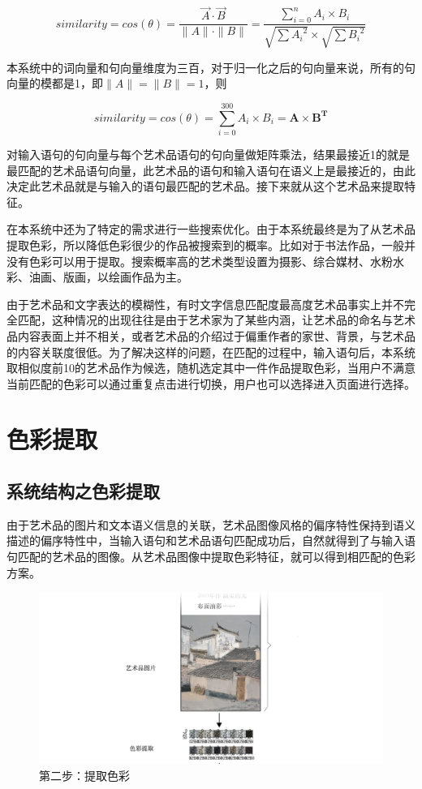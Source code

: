 $$ similarity = cos(\theta)= \frac{\vec{A}\cdot\vec{B}}{\|A\| \cdot \|B\|} = \frac{\sum_{i=0}^{n}{A_i \times B_i}}{\sqrt{\sum{{A_i}^2}} \times \sqrt{\sum{{B_i}^2}}}$$

本系统中的词向量和句向量维度为三百，对于归一化之后的句向量来说，所有的句向量的模都是1，即$\|A\| = \|B\|=1$，则

$$ similarity = cos(\theta)=  \sum_{i=0}^{300}{A_i \times B_i} = \mathbf{A} \times \mathbf{B^T}$$

对输入语句的句向量与每个艺术品语句的句向量做矩阵乘法，结果最接近1的就是最匹配的艺术品语句向量，此艺术品的语句和输入语句在语义上是最接近的，由此决定此艺术品就是与输入的语句最匹配的艺术品。\cite{ravichandran2005randomized}接下来就从这个艺术品来提取特征。

在本系统中还为了特定的需求进行一些搜索优化。由于本系统最终是为了从艺术品提取色彩，所以降低色彩很少的作品被搜索到的概率。比如对于书法作品，一般并没有色彩可以用于提取。搜索概率高的艺术类型设置为摄影、综合媒材、水粉水彩、油画、版画，以绘画作品为主。

由于艺术品和文字表达的模糊性，有时文字信息匹配度最高度艺术品事实上并不完全匹配，这种情况的出现往往是由于艺术家为了某些内涵，让艺术品的命名与艺术品内容表面上并不相关，或者艺术品的介绍过于偏重作者的家世、背景，与艺术品的内容关联度很低。为了解决这样的问题，在匹配的过程中，输入语句后，本系统取相似度前10的艺术品作为候选，随机选定其中一件作品提取色彩，当用户不满意当前匹配的色彩可以通过重复点击进行切换，用户也可以选择进入页面进行选择。

\section{色彩提取}

\subsection{系统结构之色彩提取}

由于艺术品的图片和文本语义信息的关联，艺术品图像风格的偏序特性保持到语义描述的偏序特性中，当输入语句和艺术品语句匹配成功后，自然就得到了与输入语句匹配的艺术品的图像。从艺术品图像中提取色彩特征，就可以得到相匹配的色彩方案。

\begin{figure}[!htbp]
\centering
\includegraphics[width=\linewidth,keepaspectratio]{data/chapter-1/系统内部逻辑提取.jpg}
\caption{第二步：提取色彩}
\label{figure:系统内部逻辑提取}
\end{figure}

